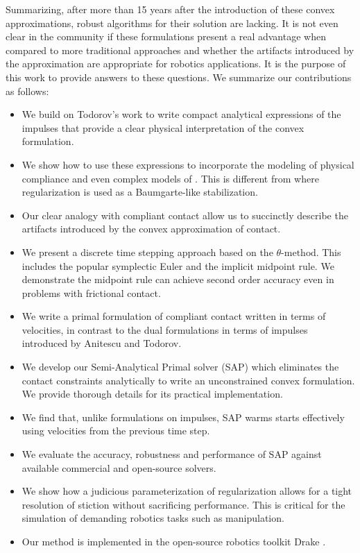 Summarizing, after more than 15 years after the introduction of these convex
approximations, robust algorithms for their solution are lacking. It is not even
clear in the community if these formulations present a real advantage when
compared to more traditional approaches and whether the artifacts introduced by
the approximation are appropriate for robotics applications. It is the purpose
of this work to provide answers to these questions. We summarize our contributions as follows:
\begin{itemize}
	\item We build on Todorov's work \cite{bib:todorov2014} to write compact
	analytical expressions of the impulses that provide a clear physical
	interpretation of the convex formulation.
	\item We show how to use these expressions to incorporate the modeling of
	physical compliance and even complex models of . This is different from
	\cite{bib:todorov2014} where regularization is used as a Baumgarte-like
	stabilization.
	\item Our clear analogy with compliant contact allow us to succinctly
	describe the artifacts introduced by the convex approximation of contact.
	\item We present a discrete time stepping approach based on the
	$\theta\text{-method}$. This includes the popular symplectic Euler and the
	implicit midpoint rule. We demonstrate the midpoint rule can achieve second
	order accuracy even in problems with frictional contact.
	\item We write a primal formulation of compliant contact written in terms of
	velocities, in contrast to the dual formulations in terms of impulses
	introduced by Anitescu and Todorov.
	\item We develop our Semi-Analytical Primal solver (SAP) which eliminates
the contact constraints analytically to write an unconstrained convex
formulation. We provide thorough details for its practical implementation.
	\item We find that, unlike formulations on impulses, SAP warms starts effectively using velocities from the previous time step. 
	\item We evaluate the accuracy, robustness and performance of SAP against available commercial and open-source solvers.
	\item We show how a judicious parameterization of regularization allows for a tight resolution of stiction without sacrificing performance. This is critical for the simulation of demanding robotics tasks such as manipulation.
	\item Our method is implemented in the open-source robotics toolkit Drake \cite{bib:drake}.
\end{itemize}


